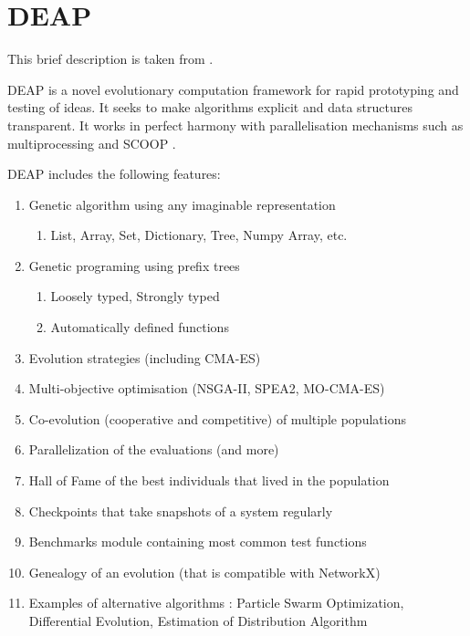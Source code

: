 
\chapter{DEAP}
\label{chap:DEAP}

This brief description is taken from \cite{DEAPGitHub2019}.

DEAP is a novel evolutionary computation framework for rapid prototyping and testing of ideas. It seeks to make algorithms explicit and data structures transparent. It works in perfect harmony with parallelisation mechanisms such as multiprocessing and SCOOP \cite{SCOOPDocs2019}.

DEAP includes the following features:
\begin{enumerate}
\item Genetic algorithm using any imaginable representation
\begin{enumerate}
\item List, Array, Set, Dictionary, Tree, Numpy Array, etc.
\end{enumerate}
\item Genetic programing using prefix trees
\begin{enumerate}
\item Loosely typed, Strongly typed
\item Automatically defined functions
\end{enumerate}
\item Evolution strategies (including CMA-ES)
\item Multi-objective optimisation (NSGA-II, SPEA2, MO-CMA-ES)
\item Co-evolution (cooperative and competitive) of multiple populations
\item Parallelization of the evaluations (and more)
\item Hall of Fame of the best individuals that lived in the population
\item Checkpoints that take snapshots of a system regularly
\item Benchmarks module containing most common test functions
\item Genealogy of an evolution (that is compatible with NetworkX)
\item Examples of alternative algorithms : Particle Swarm Optimization, Differential Evolution, Estimation of Distribution Algorithm

\end{enumerate}

